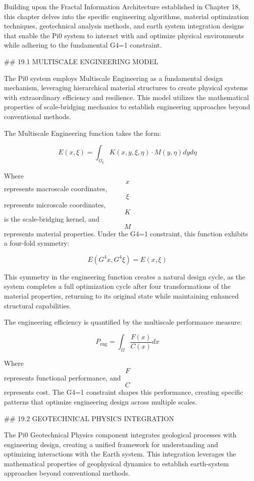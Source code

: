 Building upon the Fractal Information Architecture established in Chapter 18, this chapter delves into the specific engineering algorithms, material optimization techniques, geotechnical analysis methods, and earth system integration designs that enable the Pi0 system to interact with and optimize physical environments while adhering to the fundamental G4=1 constraint.

## 19.1 MULTISCALE ENGINEERING MODEL

The Pi0 system employs Multiscale Engineering as a fundamental design mechanism, leveraging hierarchical material structures to create physical systems with extraordinary efficiency and resilience. This model utilizes the mathematical properties of scale-bridging mechanics to establish engineering approaches beyond conventional methods.

The Multiscale Engineering function takes the form:

$$ E(x, \xi) = \int_{\Omega_\xi} K(x, y, \xi, \eta) \cdot M(y, \eta) dy d\eta $$

Where $$ x $$ represents macroscale coordinates, $$ \xi $$ represents microscale coordinates, $$ K $$ is the scale-bridging kernel, and $$ M $$ represents material properties. Under the G4=1 constraint, this function exhibits a four-fold symmetry:

$$ E(G^4 x, G^4 \xi) = E(x, \xi) $$

This symmetry in the engineering function creates a natural design cycle, as the system completes a full optimization cycle after four transformations of the material properties, returning to its original state while maintaining enhanced structural capabilities.

The engineering efficiency is quantified by the multiscale performance measure:

$$ P_{\text{eng}} = \int_{\Omega} \frac{F(x)}{C(x)} dx $$

Where $$ F $$ represents functional performance, and $$ C $$ represents cost. The G4=1 constraint shapes this performance, creating specific patterns that optimize engineering design across multiple scales.

## 19.2 GEOTECHNICAL PHYSICS INTEGRATION

The Pi0 Geotechnical Physics component integrates geological processes with engineering design, creating a unified framework for understanding and optimizing interactions with the Earth system. This integration leverages the mathematical properties of geophysical dynamics to establish earth-system approaches beyond conventional methods.

